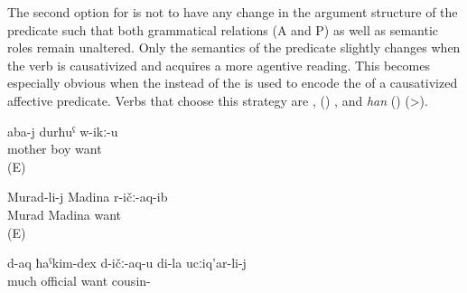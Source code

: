The second option for  is not to have any change in the argument structure of the predicate such that both grammatical relations (A and P) as well as semantic roles remain unaltered. Only the semantics of the predicate slightly changes when the verb is causativized  and acquires a more agentive reading. This becomes especially obvious when the  instead of the  is used to encode the  of a causativized affective predicate. Verbs that choose this strategy are  ,  () , and \textit{han}  ()  (>).
%
\begin{exe}
	\ex	\label{ex:Mother, son; Murad, Madina@60}
	\begin{xlist}
		\ex	\label{ex:Mother likes/wants her son@60a}
		\gll	aba-j	durħuˁ	w-ikː-u\\
			mother	boy	want\\
		\glt	{} (E)

		\ex	\label{ex:Murad loved Madina@60b}
		\gll	Murad-li-j	Madina	r-ičː-aq-ib\\
			Murad	Madina	want\\
		\glt	{} (E)
	\end{xlist}

	\ex	\label{ex:My cousin loves official appointments very much}
	\gll	d-aq	ħaˁkim-dex	d-ičː-aq-u	di-la	ucːiq'ar-li-j\\
		much	official	want		cousin-\\
	\glt	{}
\end{exe}

